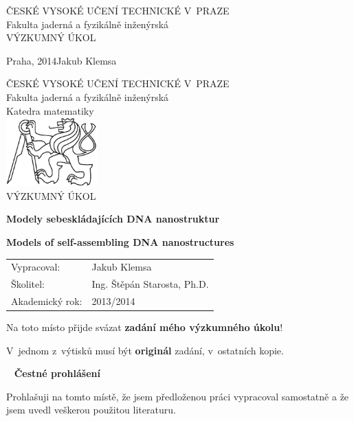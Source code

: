 \documentclass[a4paper, 11pt]{report}
\theoremstyle{definition}
\newcommand{\cvut}{ČESKÉ VYSOKÉ UČENÍ TECHNICKÉ V~PRAZE}
\newcommand{\fjfi}{Fakulta jaderná a fyzikálně inženýrská}
\newcommand{\km}{Katedra matematiky}
\newcommand{\TYPPRACE}{VÝZKUMNÝ ÚKOL}
\newcommand{\mePrace}{mého výzkumného úkolu}
\newcommand{\nazevcz}{Modely sebeskládajících DNA nanostruktur}
\newcommand{\nazeven}{Models of self-assembling DNA nanostructures}
\newcommand{\autor}{Jakub Klemsa}
\newcommand{\vedouci}{Ing. Štěpán Starosta, Ph.D.}
\newcommand{\rok}{2014}
\newcommand{\akadRok}{2013/2014}
\newcommand{\misto}{Praha}
\begin{document}
\begin{titlepage}

\thispagestyle{empty}
\begin{center}
	{\Large \cvut \\[12pt] \fjfi \\[260pt]}
	{\Huge \TYPPRACE}
\end{center}
\vfill
{
	\Large \misto, \rok \hfill \autor
}
\newpage


\thispagestyle{empty}
\begin{center}
	{\Large \cvut \\[10pt] \fjfi \\[10pt] \km \\[40pt]}
	\includegraphics[height=75pt]{lev.pdf} \\[100pt]
	
	{\LARGE \TYPPRACE \\[60pt]}
	
	{\Large\bf \nazevcz \\[30pt]}
	
	{\Large\bf \nazeven}
\end{center}
\vfill
{
	\Large
	\begin{tabular}{ll}
	Vypracoval: & \autor\\[3pt]
	Školitel: & \vedouci\\[3pt]
	Akademický rok: & \akadRok
	\end{tabular}
}
\newpage


\thispagestyle{empty}
\Large
Na toto místo přijde svázat \textbf{zadání \mePrace}!

\vspace{4mm}
V~jednom z~výtisků musí být \textbf{originál} zadání, v~ostatních kopie.
\normalsize
\newpage


\thispagestyle{empty}
~
\vfill
\noindent\textbf{Čestné prohlášení}
\vspace{0.5cm}

\noindent
Prohlašuji na tomto místě, že jsem předloženou práci vypracoval samostatně a že jsem uvedl veškerou použitou literaturu.
\vspace{1.5cm}


\end{titlepage}
\end{document}
